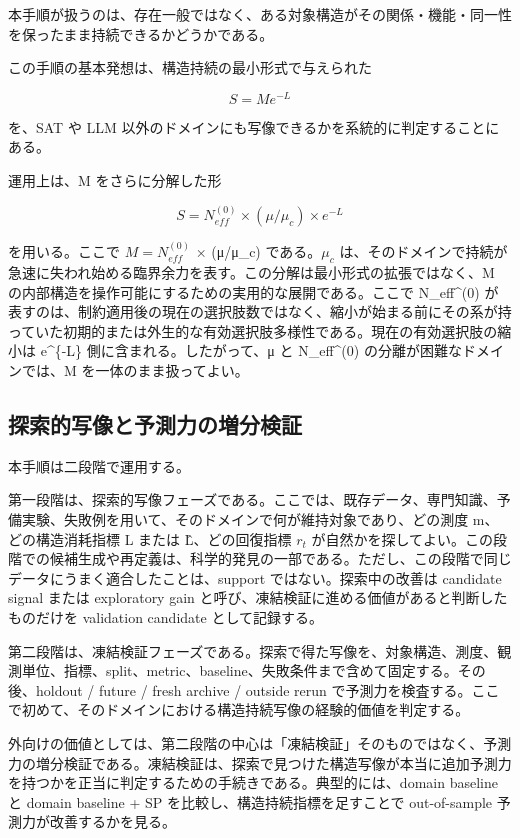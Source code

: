 \documentclass[12pt,a4paper]{article}
\begin{document}
本手順が扱うのは、存在一般ではなく、ある対象構造がその関係・機能・同一性を保ったまま持続できるかどうかである。

この手順の基本発想は、構造持続の最小形式で与えられた

\[
S = Me^{-L}
\]

を、SAT や LLM 以外のドメインにも写像できるかを系統的に判定することにある。

運用上は、M をさらに分解した形

\[
S = N_{eff}^{(0)} \times (\mu/\mu_{c}) \times e^{-L}
\]

を用いる。ここで \(M = N_{eff}^{(0)}\) × (μ/μ\_c) である。\(\mu_{c}\) は、そのドメインで持続が急速に失われ始める臨界余力を表す。この分解は最小形式の拡張ではなく、M の内部構造を操作可能にするための実用的な展開である。ここで N\_eff\^{}(0) が表すのは、制約適用後の現在の選択肢数ではなく、縮小が始まる前にその系が持っていた初期的または外生的な有効選択肢多様性である。現在の有効選択肢の縮小は e\^{}\{-L\} 側に含まれる。したがって、μ と N\_eff\^{}(0) の分離が困難なドメインでは、M を一体のまま扱ってよい。

\subsection{探索的写像と予測力の増分検証}\label{ux63a2ux7d22ux7684ux5199ux50cfux3068ux4e88ux6e2cux529bux306eux5897ux5206ux691cux8a3c}

本手順は二段階で運用する。

第一段階は、探索的写像フェーズである。ここでは、既存データ、専門知識、予備実験、失敗例を用いて、そのドメインで何が維持対象であり、どの測度 m、どの構造消耗指標 L または L̂、どの回復指標 \(r_{t}\) が自然かを探してよい。この段階での候補生成や再定義は、科学的発見の一部である。ただし、この段階で同じデータにうまく適合したことは、support ではない。探索中の改善は candidate signal または exploratory gain と呼び、凍結検証に進める価値があると判断したものだけを validation candidate として記録する。

第二段階は、凍結検証フェーズである。探索で得た写像を、対象構造、測度、観測単位、指標、split、metric、baseline、失敗条件まで含めて固定する。その後、holdout / future / fresh archive / outside rerun で予測力を検査する。ここで初めて、そのドメインにおける構造持続写像の経験的価値を判定する。

外向けの価値としては、第二段階の中心は「凍結検証」そのものではなく、予測力の増分検証である。凍結検証は、探索で見つけた構造写像が本当に追加予測力を持つかを正当に判定するための手続きである。典型的には、domain baseline と domain baseline + SP を比較し、構造持続指標を足すことで out-of-sample 予測力が改善するかを見る。
\end{document}
